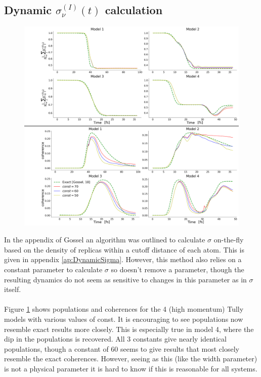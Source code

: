 \subsection{Dynamic $\sigma^{(I)}_{\nu}(t)$ calculation}
\begin{figure}[ht]
  \includegraphics[width=\textwidth]{../img/CTMQC/TullyModels/CTMQC_dynSig_highMom.png}
  \caption{\label{fig:dynamicSigma}}
\end{figure}
In the appendix of Gossel \cite{gossel_coupled-trajectory_2018} an algorithm was outlined to calculate $\sigma$ on-the-fly based on the density of replicas within a cutoff distance of each atom. This is given in appendix \ref{ap:DynamicSigma}. However, this method also relies on a constant parameter to calculate $\sigma$ so doesn't remove a parameter, though the resulting dynamics do not seem as sensitive to changes in this parameter as in $\sigma$ itself.
\\\\
Figure \ref{fig:dynamicSigma} shows populations and coherences for the 4 (high momentum) Tully models with various values of const. It is encouraging to see populations now resemble exact results more closely. This is especially true in model 4, where the dip in the populations is recovered. All 3 constants give nearly identical populations, though a constant of 60 seems to give results that most closely resemble the exact coherences. However, seeing as this (like the width parameter) is not a physical parameter it is hard to know if this is reasonable for all systems. 
